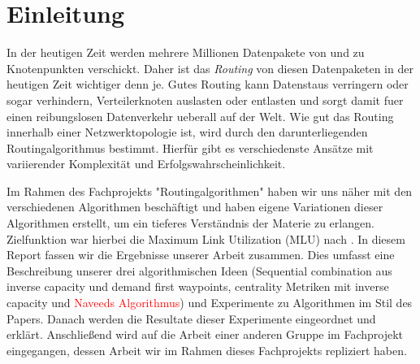 \documentclass[sigconf, nonacm, review]{acmart}
\begin{document}

\received[\"uberarbeitet]{\textcolor{red}{ausstehend}}

\maketitle

\section{Einleitung}
In der heutigen Zeit werden mehrere Millionen Datenpakete von und zu Knotenpunkten verschickt.
Daher ist das \emph{Routing} von diesen Datenpaketen in der heutigen Zeit wichtiger denn je.
Gutes Routing kann Datenstaus verringern oder sogar verhindern, Verteilerknoten auslasten oder entlasten 
und sorgt damit fuer einen reibungslosen Datenverkehr ueberall auf der Welt.
Wie gut das Routing innerhalb einer Netzwerktopologie ist, 
wird durch den darunterliegenden Routingalgorithmus bestimmt.
Hierf\"ur gibt es verschiedenste Ans\"atze mit variierender Komplexit\"at und Erfolgswahrscheinlichkeit.

Im Rahmen des Fachprojekts "Routingalgorithmen" haben wir uns n\"aher mit den verschiedenen Algorithmen besch\"aftigt 
und haben eigene Variationen dieser Algorithmen erstellt,
um ein tieferes Verst\"andnis der Materie zu erlangen.
Zielfunktion war hierbei die Maximum Link Utilization (MLU) nach \cite{foerster2021}.
In diesem Report fassen wir die Ergebnisse unserer Arbeit zusammen.
Dies umfasst eine Beschreibung unserer drei algorithmischen Ideen (Sequential combination aus inverse capacity und demand
first waypoints, centrality Metriken mit inverse capacity und \textcolor{red}{Naveeds Algorithmus})
und Experimente zu Algorithmen im Stil des Papers\cite{foerster2021}.
Danach werden die Resultate dieser Experimente eingeordnet und erkl\"art.
Anschließend wird auf die Arbeit einer anderen Gruppe im Fachprojekt eingegangen, dessen Arbeit wir im Rahmen dieses Fachprojekts repliziert haben.


\end{document}
